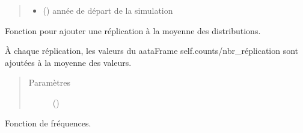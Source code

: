 \documentclass[letterpaper,10pt,french]{sphinxmanual}
\begin{document}
\begin{fulllineitems}
\begin{fulllineitems}
\begin{quote}
\begin{description}
\begin{itemize}
\item {} 
 () \textendash{} année de départ de la simulation

\end{itemize}

\end{description}\end{quote}

\end{fulllineitems}


\begin{fulllineitems}
\label{\detokenize{code:simgen.statistics.add_to_mean}}
Fonction pour ajouter une réplication à la moyenne des distributions.

À chaque réplication, les valeurs du aataFrame self.counts/nbr\_réplication sont ajoutées à la moyenne des valeurs.
\begin{quote}\begin{description}
\item[{Paramètres}] \leavevmode
{} () \textendash{} 

\end{description}\end{quote}

\end{fulllineitems}


\begin{fulllineitems}
\label{\detokenize{code:simgen.statistics.freq}}
Fonction de fréquences.


\end{fulllineitems}
\end{fulllineitems}
\end{document}
